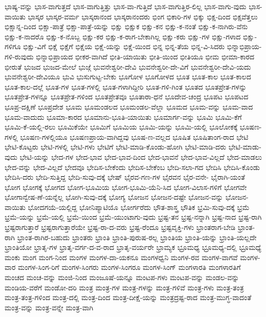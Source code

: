 {ಭಾಷ್ಯ-ವನ್ನು
ಭಾಸ-ವಾಗುತ್ತದೆ
ಭಾಸ-ವಾಗುತ್ತಿತ್ತು
ಭಾಸ-ವಾ-ಗುತ್ತಿದೆ
ಭಾಸ-ವಾಗುತ್ತಿರ-ಲಿಲ್ಲ
ಭಾಸ-ವಾಗು-ವುದು
ಭಾಸ-ವಾಯಿತು
ಭಾಸ್ಕರ
ಭಾಸ್ಕರ-ವರ್ಮ
ಭಾಸ್ಕರಾನಂದ
ಭಾಸ್ಕರಾನಂದರು
ಭಿಂಗ
ಭಿಕಾರಿ-ಗಳ
ಭಿಕ್ಕು
ಭಿಕ್ಷ-ದಿಂದ
ಭಿಕ್ಷವೆತ್ತಲು
ಭಿಕ್ಷಾನ್ನ-ದಿಂದ
ಭಿಕ್ಷಾ-ಪಾತ್ರೆ
ಭಿಕ್ಷಾ-ಪಾತ್ರೆ-ಯನ್ನು
ಭಿಕ್ಷು
ಭಿಕ್ಷುಕ
ಭಿಕ್ಷು-ಕನ
ಭಿಕ್ಷು-ಕ-ನಂತೆ
ಭಿಕ್ಷು-ಕ-ನಾಗಿರು-ವೆನು
ಭಿಕ್ಷು-ಕ-ನಾದರೊ
ಭಿಕ್ಷು-ಕ-ನೊಬ್ಬ
ಭಿಕ್ಷು-ಕರ
ಭಿಕ್ಷು-ಕ-ರಾಗ-ಬೇಕಾಗಿಲ್ಲ
ಭಿಕ್ಷು-ಕರು
ಭಿಕ್ಷು-ಗಳ
ಭಿಕ್ಷು-ಗಳಾದ
ಭಿಕ್ಷು-ಗಳಿಗೂ
ಭಿಕ್ಷು-ವಿಗೆ
ಭಿಕ್ಷೆ
ಭಿಕ್ಷೆಗೆ
ಭಿಕ್ಷೆಯ
ಭಿಕ್ಷೆ-ಯನ್ನು
ಭಿಕ್ಷೆ-ಯಿಂದ
ಭಿನ್ನ
ಭಿನ್ನ-ತೆಯ
ಭಿನ್ನ-ವಿ-ಸಿದರು
ಭಿನ್ನಾಭಿಪ್ರಾಯ-ಗಳಿ-ರುವುದು
ಭಿನ್ನಾಭಿಪ್ರಾಯದ
ಭೀಕರ-ವಾಗಿದೆ
ಭೀತಿ-ಯಾಯಿತು
ಭೀತಿ-ಯಿಂದ
ಭೀತಿಯೂ
ಭೀಮ
ಭೀಮಾ-ಕಾರದ
ಭೀರುತೆ
ಭುಜದ
ಭುಜದ-ಮೇಲೆ
ಭುಜ್ಗೆ
ಭುವನೇಶ್ವರೀ-ದೇವಿ
ಭುವನೇಶ್ವರೀ-ದೇ-ವಿಗೆ
ಭುವನೇಶ್ವರೀ-ದೇವಿ-ಯದು
ಭುವನೇಶ್ವರೀ-ದೇವಿಯೂ
ಭುವಿ
ಭುಸುಗುಟ್ಟ-ಬೇಕು
ಭೂಗೋಳ
ಭೂಗೋಳದ
ಭೂತ
ಭೂತ-ಕಾಲ
ಭೂತ-ಕಾಲದ
ಭೂತ-ಕಾಲ-ದಲ್ಲೆ
ಭೂತ-ಗಳ
ಭೂತ-ಗಳಲ್ಲಿ
ಭೂತ-ಗಳಾಗಿದ್ದೀರಿ
ಭೂತ-ಗಳಿ-ಗಿಂತ
ಭೂತದ
ಭೂತಪ್ರೇತ-ಗಳನ್ನು
ಭೂತಪ್ರೇತ-ಗಳನ್ನೂ
ಭೂತಪ್ರೇತ-ಗಳಿಂದ
ಭೂತಪ್ರೇತವೂ
ಭೂತಾರಾ-ಧನೆ
ಭೂದೇವ-ಚಂದ್ರ
ಭೂಪಟ
ಭೂಪಟದ
ಭೂಪ್ರ-ದಕ್ಷಿಣೆ
ಭೂಪ್ರದೇಶ
ಭೂಮ
ಭೂಮಂಡಲದ
ಭೂಮಂಡಲ-ವೆಲ್ಲಾ
ಭೂಮದ
ಭೂಮ-ವನ್ನು
ಭೂಮ-ವಾದ
ಭೂಮ-ವಾದುದು
ಭೂಮಾ-ಕಾರದ
ಭೂಮಾನು-ಭೂತಿ-ಯಾಯಿತು
ಭೂಮಾರ್ಗ-ವನ್ನು
ಭೂಮಿ
ಭೂಮಿ-ಕೆಗೆ
ಭೂಮಿ-ಕೆ-ಯಲ್ಲಿ-ರಲು
ಭೂಮಿಕೆಯೇ
ಭೂಮಿಗೆ
ಭೂಮಿಯ
ಭೂಮಿ-ಯನ್ನು
ಭೂಮಿ-ಯಲ್ಲಿ
ಭೂಲೋಕಕ್ಕೆ
ಭೂಷಣ-ಗಳಲ್ಲಿ
ಭೂಷಣ-ಗಳಲ್ಲಿಯೂ
ಭೂಷಣಪ್ರಾಯ-ವಾಗಿದ್ದವು
ಭೂಷ-ಣ-ವಲ್ಲದ
ಭೂಷಿತ
ಭೂಷಿತಾಂಗ-ರಾದ
ಭೇಟಿ
ಭೇಟಿ-ಕೊಟ್ಟರು
ಭೇಟಿ-ಗಳಲ್ಲಿ
ಭೇಟಿ-ಗಳು
ಭೇಟಿಗೆ
ಭೇಟಿ-ಮಾಡಿ-ಕೊಂಡು-ಹೋಗಿ
ಭೇಟಿ-ಮಾಡಿ-ದರು
ಭೇಟಿ-ಮಾಡು-ವುದು
ಭೇಟಿ-ಯನ್ನು
ಭೇದ-ಗಳ
ಭೇದ-ಭಾವ
ಭೇದ-ಭಾವ-ದಿಂದ
ಭೇದ-ಭಾವನೆ
ಭೇದ-ಭಾವ-ವಿಲ್ಲದೆ
ಭೇದ-ಮಾಡಲು
ಭೇದ-ವನ್ನು
ಭೇದ-ವಿಲ್ಲದೆ
ಭೇದವೂ
ಭೇದಿಸ-ಬೇಕೆಂದು
ಭೇದಿಸ-ಬೇಕೆಂಬ
ಭೇದಿ-ಸಲಾ-ಗದ
ಭೇದಿಸಿ
ಭೇದಿಸಿ-ಕೊಂಡು
ಭೇದಿಸಿ-ದರು
ಭೇದಿ-ಸುತ್ತಿದ್ದ
ಭೇದಿ-ಸುವು-ದಕ್ಕೆ
ಭೇಷ್
ಭೈರವ-ಗಣ-ಗಳ
ಭೈರವನ
ಭೈರ-ವನೇ-
ಭೈರಾಗಿ-ಯಂತೆ
ಭೋಗ
ಭೋಗಕ್ಕೆ
ಭೋಗದ
ಭೋಗ-ಭೂಮಿಯ
ಭೋಗ-ಭೂಮಿ-ಯೆನಿ-ಸಿದ
ಭೋಗ-ವಿಲಾಸ-ಗಳಿಗೆ
ಭೋಗವೇ
ಭೋಗಾನ್ವೇಷ-ಣೆ-ಯನ್ನೆಲ್ಲ
ಭೋಗಿ-ಸುವು-ದಕ್ಕೆ
ಭೋಗ್ಯ
ಭೋಜನ
ಭೋಜನ-ದಷ್ಟೇ
ಭೋಜನ-ವನ್ನು
ಭೋಜನ-ವಾಯಿತು
ಭೋದಗಯೆ-ಯಲ್ಲಿದ್ದ
ಭೋನಿಪ್ಯಾಟಿಯೊ
ಭೋರ್ಗರೆದು
ಭೌತ-ಶಾಸ್ತ್ರ
ಭೌತಿಕ
ಭ್ರಮಿ-ಸುವು-ದಕ್ಕೆ
ಭ್ರಮೆ
ಭ್ರಮೆ-ಯನ್ನು
ಭ್ರಮೆ-ಯಲ್ಲಿ
ಭ್ರಮೆ-ಯಿಂದ
ಭ್ರಮೆ-ಯುಂಟಾಗು-ವುದು
ಭ್ರಷ್ಟ-ತನ
ಭ್ರಷ್ಟ-ನನ್ನಾಗಿ
ಭ್ರಷ್ಟ-ನಾದ
ಭ್ರಷ್ಟ-ರಾಗಿ
ಭ್ರಷ್ಟರಾಗುತ್ತಾರೆ
ಭ್ರಷ್ಟರಾಗುತ್ತಾರೆಯೇ
ಭ್ರಷ್ಟ-ರಾ-ದ-ವರು
ಭ್ರಷ್ಟ-ರೆಂದೂ
ಭ್ರಷ್ಟವೃಕ್ತಿ-ಗಳು
ಭ್ರಾಂತರಾಗ-ಬೇಡಿ
ಭ್ರಾಂತ-ರಾಗಿ
ಭ್ರಾಂತ-ರಾಗಿರ-ಬಹುದು
ಭ್ರಾಂತರು
ಭ್ರಾಂತಿ
ಭ್ರಾಂತಿ-ಪುರುಷ-ರಲ್ಲ
ಭ್ರಾಂತಿಯ
ಭ್ರಾಂತಿ-ಯನ್ನು
ಭ್ರಾಂತಿ-ಯಲ್ಲದೇ
ಭ್ರಾಂತಿಯೋ
ಭ್ರಾತೃ-ಗಳ
ಭ್ರಾತೃ-ವರ್ಗ-ದ-ವ-ರಾದ
ಭ್ರಾತೃ-ವರ್ಯರೇ
ಭ್ರಾಮ್ಯಕ
ಭ್ರೂಮಧ್ಯ
ಭ್ರೂಮಧ್ಯ-ದಲ್ಲಿ
ಭ್ರೂಮಧ್ಯೆ
ಮಂಕು
ಮಂಗ
ಮಂಗ-ನಿಂದ
ಮಂಗಳ
ಮಂಗಳ-ದಾ-ಯಕನೂ
ಮಂಗಳಧ್ವನಿ
ಮಂಗಳ-ರವ
ಮಂಗಳ-ವಾಗವೆ
ಮಂಗಳ-ವಾರ
ಮಂಗಳ-ಸಿಂಗ-ರಿಗೆ
ಮಂಗಳ-ಸಿಂಗರು
ಮಂಗಳ-ಸಿಂಗರೂ
ಮಂಗಳ-ಸಿಂಗ್
ಮಂಗಳಾರತಿ
ಮಂಗಳಾರತಿಗೆ
ಮಂಚದ
ಮಂಚ-ವನ್ನು
ಮಂಜಿ-ನಿಂದ
ಮಂಜೂಷೆ-ಯನ್ನೂ
ಮಂಟಪ-ಗಳು
ಮಂಟಪ-ವನ್ನು
ಮಂಡಲ-ವನ್ನು
ಮಂಡಿಯ-ವರೆಗೆ
ಮಂಡೋ-ದರಿ
ಮಂತ್ರ
ಮಂತ್ರ-ಗಳ
ಮಂತ್ರ-ಗಳನ್ನು
ಮಂತ್ರ-ಗಳಿವೆ
ಮಂತ್ರ-ಗಳು
ಮಂತ್ರ-ತಂತ್ರ
ಮಂತ್ರ-ತಂತ್ರ-ಗಳಿಂದ
ಮಂತ್ರ-ದಲ್ಲಿ
ಮಂತ್ರ-ದಿಂದ
ಮಂತ್ರ-ದೀಕ್ಷೆ-ಯನ್ನು
ಮಂತ್ರದ್ರಷ್ಟ-ರಾದ
ಮಂತ್ರ-ಮುಗ್ಧ-ವಾದಂತೆ
ಮಂತ್ರ-ವನ್ನು
ಮಂತ್ರ-ವನ್ನೇ
ಮಂತ್ರ-ವಾಗಿ
}
